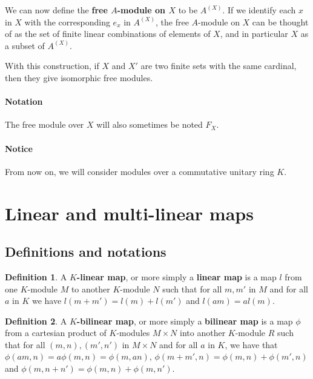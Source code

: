\documentclass{report}
\theoremstyle{definition}
\newtheorem{defin}{Definition}
\theoremstyle{remark}
\begin{document}
We can now define the \textbf{free $A$-module on $X$} to be $A^{(X)}$. If we identify each $x$ in $X$ with the corresponding $e_x$ in $A^{(X)}$, the free $A$-module on $X$ can be thought of as the set of finite linear combinations of elements of $X$, and in particular $X$ as a subset of $A^{(X)}$.

With this construction, if $X$ and $X'$ are two finite sets with the same cardinal, then they give isomorphic free modules.  

\paragraph{Notation} The free module over $X$ will also sometimes be noted $F_X$. 




\bigskip


\paragraph{Notice} From now on, we will consider modules over a commutative unitary ring $K$.
\bigskip



\section{Linear and multi-linear maps}\label{multilinearmaps}

\subsection{Definitions and notations}

 \begin{defin}
  A \textbf{$K$-linear map}, or more simply a \textbf{linear map} is a map $l$ from one $K$-module $M$ to another $K$-module $N$ such that for all $m,m'$ in $M$ and for all $a$ in $K$ we have $l(m+m') = l(m) + l(m')$ and $l(am) = al(m)$.
 \end{defin}
 
 \begin{defin}
  A \textbf{$K$-bilinear map}, or more simply a \textbf{bilinear map} is a map $\phi$ from a cartesian product of  $K$-modules $M \times N$ into another $K$-module $R$ such that for all $(m,n),(m',n')$ in $M\times N$ and for all $a$ in $K$, we have that $\phi(am,n)=a\phi(m,n)=\phi(m,an)$, $\phi(m+m',n) = \phi(m,n)+\phi(m',n)$ and $\phi(m
  ,n+n')=\phi(m,n) +\phi(m,n')$.
 \end{defin}
\end{document}
